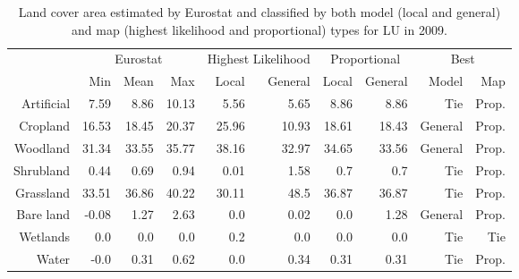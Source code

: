     \begin{table}[H]
    \centering
    \caption{Land cover area estimated by Eurostat and classified by both model (local and general) and map (highest likelihood and proportional) types for LU in 2009.}
    
    \begin{tabular}{r|rrr|rr|rr|rr}
    \toprule
    {} & \multicolumn{3}{|c}{Eurostat} & \multicolumn{2}{|c}{Highest Likelihood} & \multicolumn{2}{|c}{Proportional} & \multicolumn{2}{|c}{Best} \\
    {} &      Min &   Mean &    Max &              Local & General &        Local & General &    Model &    Map \\
    \midrule
    Artificial &     7.59 &   8.86 &  10.13 &               5.56 &    5.65 &         8.86 &    8.86 &      Tie &  Prop. \\
    Cropland   &    16.53 &  18.45 &  20.37 &              25.96 &   10.93 &        18.61 &   18.43 &  General &  Prop. \\
    Woodland   &    31.34 &  33.55 &  35.77 &              38.16 &   32.97 &        34.65 &   33.56 &  General &  Prop. \\
    Shrubland  &     0.44 &   0.69 &   0.94 &               0.01 &    1.58 &          0.7 &     0.7 &      Tie &  Prop. \\
    Grassland  &    33.51 &  36.86 &  40.22 &              30.11 &    48.5 &        36.87 &   36.87 &      Tie &  Prop. \\
    Bare land  &    -0.08 &   1.27 &   2.63 &                0.0 &    0.02 &          0.0 &    1.28 &  General &  Prop. \\
    Wetlands   &      0.0 &    0.0 &    0.0 &                0.2 &     0.0 &          0.0 &     0.0 &      Tie &    Tie \\
    Water      &     -0.0 &   0.31 &   0.62 &                0.0 &    0.34 &         0.31 &    0.31 &      Tie &  Prop. \\
    \bottomrule
    \end{tabular}
    \end{table}
    
